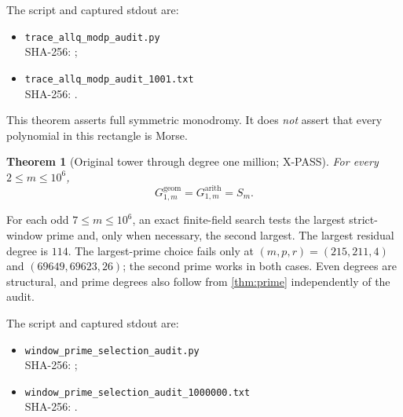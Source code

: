 \documentclass[11pt]{article}
\theoremstyle{keio}
\newtheorem{theorem}{Theorem}[section]
\theoremstyle{keioinput}
\newcommand{\XPASS}{\textcolor{xpassblue}{\textsf{X-PASS}}}
\begin{document}
The script and captured stdout are:
\begin{itemize}
\item \nolinkurl{trace_allq_modp_audit.py}\\[-.15em]
\textcolor{bluegray}{\small SHA-256: }
\texttt{\small{}};
\item \nolinkurl{trace_allq_modp_audit_1001.txt}\\[-.15em]
\textcolor{bluegray}{\small SHA-256: }
\texttt{\small{}}.
\end{itemize}

\begin{notebox}
This theorem asserts full symmetric monodromy. It does \emph{not} assert
that every polynomial in this rectangle is Morse.
\end{notebox}

\begin{theorem}[Original tower through degree one million; \XPASS]\label{thm:million}
For every $2\le m\le10^6$,
\begin{equation}
\boxed{G^{\mathrm{geom}}_{1,m}=G^{\mathrm{arith}}_{1,m}=S_m.}
\label{eq:million}
\end{equation}
\end{theorem}

For each odd $7\le m\le10^6$, an exact finite-field search tests the largest
strict-window prime and, only when necessary, the second largest. The largest
residual degree is $114$. The largest-prime choice fails only at
$(m,p,r)=(215,211,4)$ and $(69649,69623,26)$; the second prime works in both
cases. Even degrees are structural, and prime degrees also follow from
\cref{thm:prime} independently of the audit.

The script and captured stdout are:
\begin{itemize}
\item \nolinkurl{window_prime_selection_audit.py}\\[-.15em]
\textcolor{bluegray}{\small SHA-256: }
\texttt{\small{}};
\item \nolinkurl{window_prime_selection_audit_1000000.txt}\\[-.15em]
\textcolor{bluegray}{\small SHA-256: }
\texttt{\small{}}.
\end{itemize}
\end{document}
